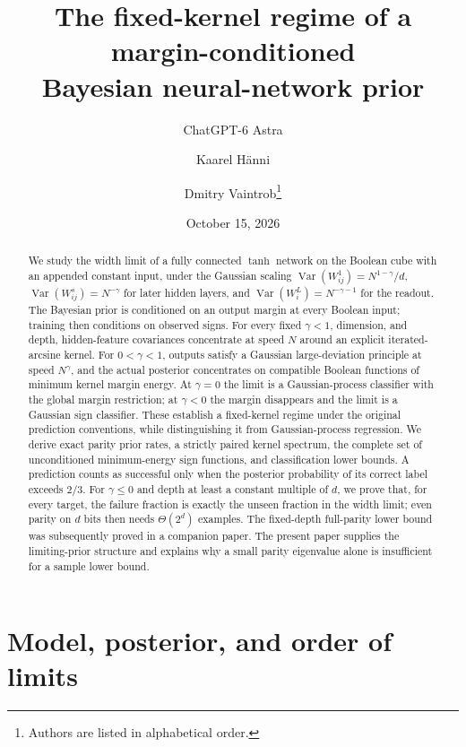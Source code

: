 \documentclass[11pt]{article}
\title{The fixed-kernel regime of a margin-conditioned\\Bayesian neural-network prior}
\author{ChatGPT-6 Astra \and Kaarel H\"anni \and Dmitry Vaintrob\thanks{Authors are listed in alphabetical order.}}
\date{October 15, 2026}
\theoremstyle{remark}
\begin{document}
\maketitle
\begin{abstract}
We study the width limit of a fully connected $\tanh$ network on the
Boolean cube with an appended constant input, under the Gaussian
scaling $\operatorname{Var}(W^1_{ij})=N^{1-\gamma}/d$,
$\operatorname{Var}(W^s_{ij})=N^{-\gamma}$ for later hidden layers, and
$\operatorname{Var}(W^L_i)=N^{-\gamma-1}$ for the readout. The Bayesian
prior is conditioned on an output margin at every Boolean input;
training then conditions on observed signs. For every fixed
$\gamma<1$, dimension, and depth, hidden-feature covariances concentrate
at speed $N$ around an explicit iterated-arcsine kernel. For
$0<\gamma<1$, outputs satisfy a Gaussian large-deviation principle at
speed $N^\gamma$, and the actual posterior concentrates on compatible
Boolean functions of minimum kernel margin energy. At $\gamma=0$ the
limit is a Gaussian-process classifier with the global margin
restriction; at $\gamma<0$ the margin disappears and the limit is a
Gaussian sign classifier. These establish a fixed-kernel regime under
the original prediction conventions, while distinguishing it from
Gaussian-process regression. We derive exact parity prior rates, a
strictly paired kernel spectrum, the complete set of unconditioned
minimum-energy sign functions, and classification lower bounds. A
prediction counts as successful only when the posterior probability
of its correct label exceeds $2/3$. For $\gamma\le0$ and depth
at least a constant multiple of $d$, we prove that, for every target, the
failure fraction is exactly the unseen fraction in the width limit; even
parity on $d$ bits then needs $\Theta(2^d)$ examples. The fixed-depth full-parity lower bound was subsequently proved in a
companion paper. The present paper supplies the limiting-prior structure
and explains why a small parity eigenvalue alone is insufficient for a
sample lower bound.
\end{abstract}

\section{Model, posterior, and order of limits}
\end{document}
